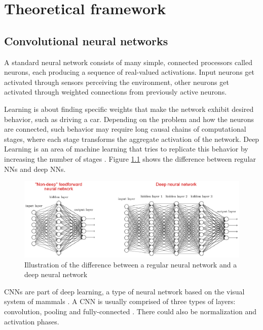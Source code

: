 \chapter{Theoretical framework}
\label{ch:marco}

\section{Convolutional neural networks}

A standard neural network consists of many simple, connected processors called neurons,
each producing a sequence of real-valued activations. Input neurons get activated through 
sensors perceiving the environment, other neurons get activated through weighted connections from previously
active neurons.

Learning is about finding specific weights that make the network exhibit desired behavior,
such as driving a car. Depending on the problem and how the neurons are connected, such behavior
may require long causal chains of computational stages, where each stage transforms 
the aggregate activation of the network. Deep Learning is an area of machine learning that tries to
replicate this behavior by increasing the number of stages \cite{schmidhuber2015deep}.
Figure \ref{fig:nnvscnn} shows the difference between regular NNs and deep NNs.

\begin{figure}
  \includegraphics[width=\linewidth]{fig/nnvscnn.eps}
  \caption{Illustration of the difference between a regular neural network and a deep neural network \cite{nielsen2015neural}}
  \label{fig:nnvscnn}
\end{figure}

CNNs are part of deep learning, a type of neural network based on the 
visual system of mammals \cite{fukushima1980neocognitron}\cite{hubel1968receptive}.
A CNN is usually comprised of three types of layers: convolution, pooling and 
fully-connected \cite{karpathy2016cs231n}. There could also be normalization and activation phases.

